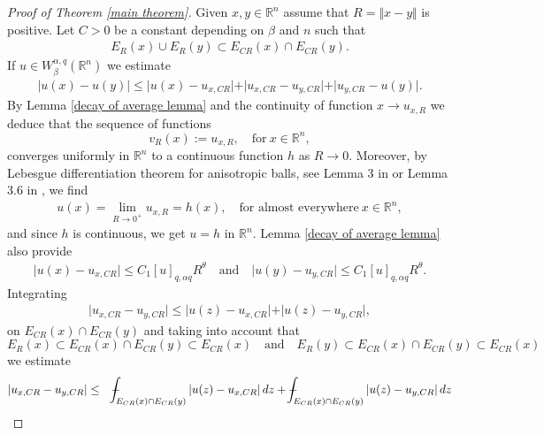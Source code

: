 \documentclass[10pt, leqno]{article}
\def\Xint#1{\mathchoice
{\XXint\displaystyle\textstyle{#1}}
{\XXint\textstyle\scriptstyle{#1}}
{\XXint\scriptstyle\scriptscriptstyle{#1}}
{\XXint\scriptscriptstyle\scriptscriptstyle{#1}}
\!\int}
\def\XXint#1#2#3{{\setbox0=\hbox{$#1{#2#3}{\int}$ }
\vcenter{\hbox{$#2#3$ }}\kern-.6\wd0}}
\def\dashint{\Xint-}
\theoremstyle{definition}
\theoremstyle{remark}
\numberwithin{equation}{section}
\begin{document}
\begin{proof}[Proof of Theorem \ref{main theorem}]
Given $x, y \in \mathbb{R}^{n}$ assume that $R = \Vert x - y \Vert$ is positive. Let $C> 0$ be a constant depending on $\beta$ and $n$ such that
\begin{eqnarray}
E_{R}(x) \cup E_{R}(y) \subset E_{CR}(x) \cap E_{CR}(y).
\end{eqnarray}
If $u \in W_{\beta}^{\alpha, q}(\mathbb{R}^{n})$ we estimate
\begin{eqnarray}
\label{main theorem 1.1}
\vert u(x) - u(y) \vert \leq \vert u(x) - u_{x, CR} \vert + \vert u_{x, CR} - u_{y, CR} \vert + \vert u_{y, CR} - u(y) \vert.
\end{eqnarray}
By Lemma \ref{decay of average lemma} and the continuity of function $x \rightarrow u_{x, R}$ we deduce that the sequence of functions
$$
v_{R}(x):= u_{x, R}, \quad \text{for} \ x \in \mathbb{R}^{n},
$$
converges uniformly in $\mathbb{R}^{n}$ to a continuous function $h$ as $R \rightarrow 0$. Moreover, by Lebesgue differentiation theorem for anisotropic balls, see Lemma 3 in \cite{CC} or Lemma 3.6 in \cite{CLU}, we find
\begin{eqnarray}
\label{main theorem 1}
u(x) = \lim_{R \rightarrow 0^{+}} u_{x, R} = h(x), \quad \text{for almost everywhere} \ x \in \mathbb{R}^{n},
\end{eqnarray}
and since $h$ is continuous, we get $u = h$ in $\mathbb{R}^{n}$. Lemma \ref{decay of average lemma} also provide
\begin{eqnarray}
\label{main theorem 2}
\vert u(x) - u_{x, CR} \vert \leq C_{1}\left[ u\right]_{q, \alpha q}R^{\theta} \quad \text{and} \quad \vert u(y) - u_{y, CR} \vert \leq C_{1}\left[ u\right]_{q, \alpha q}R^{\theta}.
\end{eqnarray}
Integrating
\begin{eqnarray*}
\vert u_{x, CR} - u_{y, CR} \vert \leq \vert u(z) - u_{x, CR}  \vert + \vert u(z) - u_{y, CR} \vert,
\end{eqnarray*}
on $ E_{CR}(x) \cap E_{CR}(y)$ and taking into account that
$$
E_{R}(x)\subset E_{CR}(x) \cap E_{CR}(y) \subset E_{CR}(x) \quad \text{and} \quad  E_{R}(y)\subset E_{CR}(x) \cap E_{CR}(y)\subset E_{CR}(x)
$$
we estimate
\begin{eqnarray}
\label{main theorem 4}
\vert u_{x, CR} - u_{y, CR} \vert & \leq & \nonumber \dashint_{ E_{CR}(x) \cap E_{CR}(y)}\vert u(z) - u_{x, CR}\vert \, dz +  \dashint_{ E_{CR}(x) \cap E_{CR}(y)}\vert u(z) - u_{y, CR}\vert \, dz \\

\end{eqnarray}
\end{proof}
\end{document}
